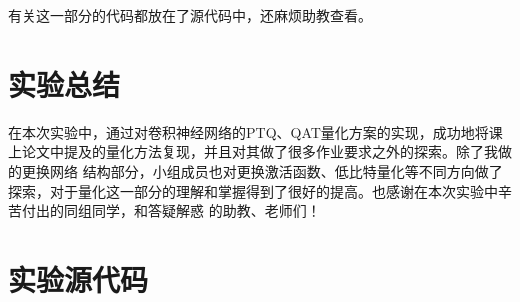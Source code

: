 \documentclass[UTF8]{ctexart}
\begin{document}
有关这一部分的代码都放在了源代码中，还麻烦助教查看。


\section{实验总结}

在本次实验中，通过对卷积神经网络的PTQ、QAT量化方案的实现，成功地将课上论文中提及的量化方法复现，并且对其做了很多作业要求之外的探索。除了我做的更换网络
结构部分，小组成员也对更换激活函数、低比特量化等不同方向做了探索，对于量化这一部分的理解和掌握得到了很好的提高。也感谢在本次实验中辛苦付出的同组同学，和答疑解惑
的助教、老师们！

\newpage
\section{实验源代码}
\end{document}
